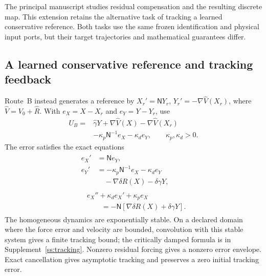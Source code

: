 The principal manuscript studies residual compensation and the resulting discrete map. This extension retains the alternative task of tracking a learned conservative reference. Both tasks use the same frozen identification and physical input ports, but their target trajectories and mathematical guarantees differ.

\subsection{A learned conservative reference and tracking feedback}
\label{struct:route-b-section}

Route~B instead generates a reference by $X_r'=\mathsf N Y_r$, $Y_r'=-\nabla\widehat V(X_r)$, where $\widehat V=V_0+\widehat R$. With $e_X=X-X_r$ and $e_Y=Y-Y_r$, use
\begin{equation}\label{struct:route-b-control}
\begin{aligned}
 U_B={}&\widehat\gamma Y+\nabla\widehat V(X)
                     -\nabla\widehat V(X_r)\\
       &-\kappa_p\mathsf N^{-1}e_X-\kappa_de_Y,
       \qquad\kappa_p,\kappa_d>0.
\end{aligned}
\end{equation}
The error satisfies the exact equations
\begin{equation}\label{struct:route-b-error}
\begin{gathered}
\begin{aligned}
 e_X'&=\mathsf N e_Y,\\
 e_Y'&=-\kappa_p\mathsf N^{-1}e_X-\kappa_de_Y
           \\&\quad-\nabla\delta R(X)-\delta\gamma Y,
\end{aligned}\\
\begin{aligned}
 &e_X''+\kappa_de_X'+\kappa_pe_X\\
 &\qquad=-\mathsf N[\nabla\delta R(X)+\delta\gamma Y].
\end{aligned}
\end{gathered}
\end{equation}
The homogeneous dynamics are exponentially stable. On a declared domain where the force error and velocity are bounded, convolution with this stable system gives a finite tracking bound; the critically damped formula is in Supplement~\ref{ss:tracking}. Nonzero residual forcing gives a nonzero error envelope. Exact cancellation gives asymptotic tracking and preserves a zero initial tracking error.

